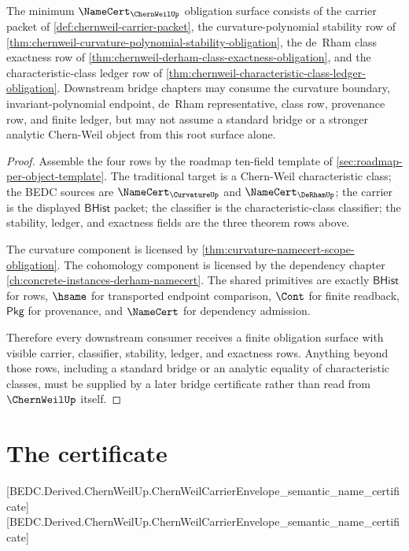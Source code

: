 \begin{theorem}
\label{thm:chernweil-root-namecert-obligation-surface}
The minimum $\NameCert_{\ChernWeilUp}$ obligation surface consists of the carrier packet of \autoref{def:chernweil-carrier-packet}, the curvature-polynomial stability row of \autoref{thm:chernweil-curvature-polynomial-stability-obligation}, the de~Rham class exactness row of \autoref{thm:chernweil-derham-class-exactness-obligation}, and the characteristic-class ledger row of \autoref{thm:chernweil-characteristic-class-ledger-obligation}. Downstream bridge chapters may consume the curvature boundary, invariant-polynomial endpoint, de~Rham representative, class row, provenance row, and finite ledger, but may not assume a standard bridge or a stronger analytic Chern-Weil object from this root surface alone.
\end{theorem}
\begin{proof}
Assemble the four rows by the roadmap ten-field template of \autoref{sec:roadmap-per-object-template}. The traditional target is a Chern-Weil characteristic class; the BEDC sources are $\NameCert_{\CurvatureUp}$ and $\NameCert_{\DeRhamUp}$; the carrier is the displayed $\mathsf{BHist}$ packet; the classifier is the characteristic-class classifier; the stability, ledger, and exactness fields are the three theorem rows above.

The curvature component is licensed by \autoref{thm:curvature-namecert-scope-obligation}. The cohomology component is licensed by the dependency chapter \autoref{ch:concrete-instances-derham-namecert}. The shared primitives are exactly $\mathsf{BHist}$ for rows, $\hsame$ for transported endpoint comparison, $\Cont$ for finite readback, $\mathsf{Pkg}$ for provenance, and $\NameCert$ for dependency admission.

Therefore every downstream consumer receives a finite obligation surface with visible carrier, classifier, stability, ledger, and exactness rows. Anything beyond those rows, including a standard bridge or an analytic equality of characteristic classes, must be supplied by a later bridge certificate rather than read from $\ChernWeilUp$ itself.
\end{proof}

\section{The certificate}
\label{sec:chernweil-certificate}
[BEDC.Derived.ChernWeilUp.ChernWeilCarrierEnvelope\_semantic\_name\_certificate]
[BEDC.Derived.ChernWeilUp.ChernWeilCarrierEnvelope\_semantic\_name\_certificate]


